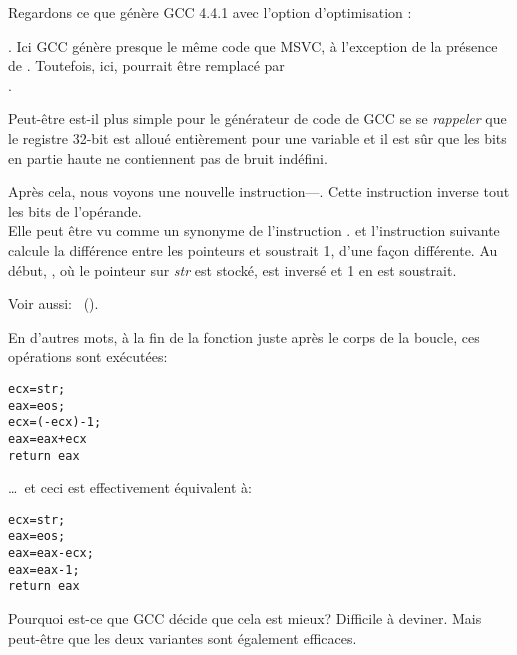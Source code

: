 


Regardons ce que génère GCC 4.4.1 avec l'option d'optimisation \Othree:



.
Ici GCC génère presque le même code que MSVC, à l'exception de la présence de \MOVZX.
Toutefois, ici, \MOVZX pourrait être remplacé par\\
.

Peut-être est-il plus simple pour le générateur de code de GCC se se \emph{rappeler}
que le registre 32-bit \EDX est alloué entièrement pour une variable \Tchar et il
est sûr que les bits en partie haute ne contiennent pas de bruit indéfini.

\label{strlen_NOT_ADD}

Après cela, nous voyons une nouvelle instruction---\NOT. Cette instruction inverse
tout les bits de l'opérande. \\
Elle peut être vu comme un synonyme de l'instruction .
\NOT et l'instruction suivante \ADD calcule la différence entre les pointeurs et
soustrait 1, d'une façon différente.
Au début, \ECX, où le pointeur sur \emph{str} est stocké, est inversé et 1 en est soustrait.

Voir aussi: \q{\SignedNumbersSectionName}~().

En d'autres mots, à la fin de la fonction juste après le corps de la boucle, ces opérations
sont exécutées:

\begin{lstlisting}[style=customc]
ecx=str;
eax=eos;
ecx=(-ecx)-1;
eax=eax+ecx
return eax
\end{lstlisting}

\dots~et ceci est effectivement équivalent à:

\begin{lstlisting}[style=customc]
ecx=str;
eax=eos;
eax=eax-ecx;
eax=eax-1;
return eax
\end{lstlisting}

Pourquoi est-ce que GCC décide que cela est mieux? Difficile à deviner.
Mais peut-être que les deux variantes sont également efficaces.
